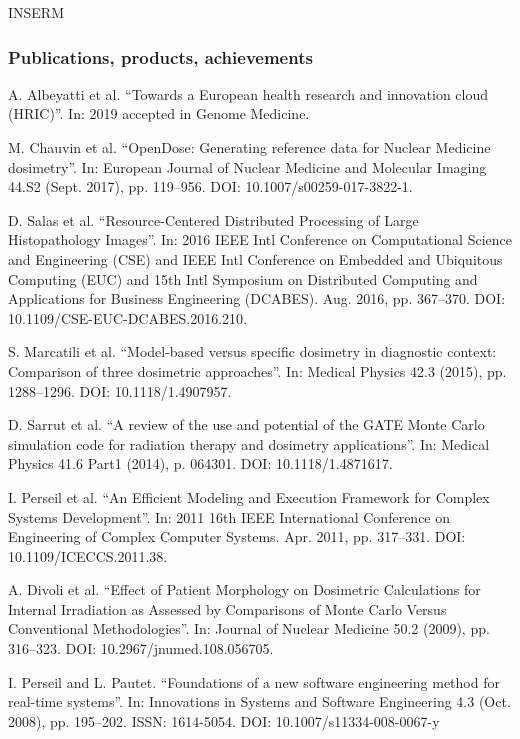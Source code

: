 \begin{sitedescription}{INSERM}
\subsubsection*{Publications, products, achievements}
\begin{compactenum}
\item A. Albeyatti et al. “Towards a European health research and innovation
  cloud (HRIC)”. In: 2019 accepted in Genome Medicine.
\item M. Chauvin et al. “OpenDose: Generating reference data for Nuclear
  Medicine dosimetry”. In: European Journal of Nuclear Medicine and Molecular
  Imaging 44.S2 (Sept. 2017), pp. 119--956. DOI: 10.1007/s00259-017-3822-1.
\item D. Salas et al. “Resource-Centered Distributed Processing of Large
  Histopathology Images”. In: 2016 IEEE Intl Conference on Computational
  Science and Engineering (CSE) and IEEE Intl Conference on Embedded and
  Ubiquitous Computing (EUC) and 15th Intl Symposium on Distributed Computing
  and Applications for Business Engineering (DCABES). Aug. 2016, pp. 367--370.
  DOI: 10.1109/CSE-EUC-DCABES.2016.210.
\item S. Marcatili et al. “Model-based versus specific dosimetry in diagnostic
  context: Comparison of three dosimetric approaches”. In: Medical Physics 42.3
  (2015), pp. 1288--1296. DOI: 10.1118/1.4907957.
\item D. Sarrut et al. “A review of the use and potential of the GATE Monte
  Carlo simulation code for radiation therapy and dosimetry applications”. In:
  Medical Physics 41.6 Part1 (2014), p. 064301. DOI: 10.1118/1.4871617.
\item I. Perseil et al. “An Efficient Modeling and Execution Framework for
  Complex Systems Development”. In: 2011 16th IEEE International Conference on
  Engineering of Complex Computer Systems. Apr. 2011, pp. 317--331. DOI:
  10.1109/ICECCS.2011.38.
\item  A. Divoli et al. “Effect of Patient Morphology on Dosimetric
  Calculations for Internal Irradiation as Assessed by Comparisons of Monte
  Carlo Versus Conventional Methodologies”. In: Journal of Nuclear Medicine
  50.2 (2009), pp. 316--323. DOI: 10.2967/jnumed.108.056705.
\item I. Perseil and L. Pautet. “Foundations of a new software engineering
  method for real-time systems”. In: Innovations in Systems and Software
  Engineering 4.3 (Oct. 2008), pp. 195--202. ISSN: 1614-5054. DOI:
  10.1007/s11334-008-0067-y
\end{compactenum}


\end{sitedescription}
